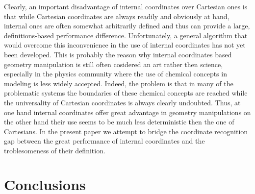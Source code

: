 \documentclass[prl,aps,preprint,superbib,12pt]{revtex4}
\begin{document}
Clearly, an important disadvantage of internal coordinates 
over Cartesian ones
is that while Cartesian coordinates are always readily and
obviously at hand,
internal ones are often somewhat arbitrarily defined and thus
can provide a large, definitions-based performance difference. 
Unfortunately,
a general algorithm that would overcome this inconvenience in the use
of internal coordinates has not yet been developed. This is probably
the reason why internal coordinates based geometry manipulation
is still often cosidered an art rather then science, especially
in the physics community where the use of chemical concepts in 
modeling is less widely accepted. 
Indeed, the problem is that in many of the
problematic systems the boundaries of these chemical concepts are 
reached while the universality of Cartesian coordinates is always 
clearly undoubted. Thus, at one hand internal coordinates offer
great advantage in geometry manipulations on the other hand their
use seems to be much less deterministic then the one of Cartesians.
In the present paper we attempt to bridge the coordinate recognition
gap between the great performance of internal coordinates and the 
troblesomeness of their definition.



\section{Conclusions} \label{Conclusions}


\end{document}
